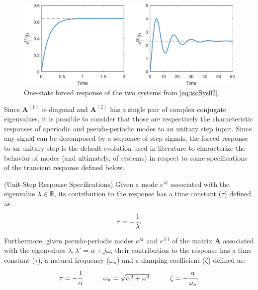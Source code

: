 \documentclass[a4paper,11pt]{book}
\numberwithin{figure}{chapter}
\numberwithin{equation}{chapter}
\numberwithin{table}{chapter}
\theoremstyle{definition}
\newtheorem{definition}{Definition}[chapter]
\newcounter{boxed-theorem}
\newcounter{boxed-definition}
\newenvironment{boxed-definition}[1]
{\begin{shaded} \begin{definition}{#1}}
{\end{definition} \end{shaded}}
\begin{document}
\begin{figure}[ht]
    \centering
    \includegraphics[width=\textwidth]{chapter2/forcedResponse}
    \caption{One-state forced response of the two systems from \eqref{eq:isoSys02}.}
    \label{fig:forcedResponse}
\end{figure}

Since $\bm{A}^{(1)}$ is diagonal and $\bm{A}^{(2)}$ has a single pair of complex conjugate eigenvalues, it is possible to consider that those are respectively the characteristic responses of aperiodic and pseudo-periodic modes to an unitary step input. Since any signal can be decomposed by a sequence of step signals, the forced response to an unitary step is the default evolution used in literature to characterize the behavior of modes (and ultimately, of systems) in respect to some specifications of the transient response defined below.

\begin{boxed-definition}{(Unit-Step Response Specifications)} \label{def:responseParameters}
    Given a mode $e^{\lambda t}$ associated with the eigenvalue $\lambda \in \mathbb{R}$, its contribution to the response has a time constant ($\tau$) defined as
    \begin{equation}
        \tau = - \cfrac{1}{\lambda}
    .\end{equation}  
    
    Furthermore, given pseudo-periodic modes $e^{\lambda t}$ and $e^{\lambda' t}$ of the matrix $\bm{A}$ associated with the eigenvalues $\lambda,\lambda' = \alpha \pm j \omega$, their contribution to the response has a time constant ($\tau$), a natural frequency ($\omega_n$) and a damping coefficient ($\zeta$) defined as:
    \begin{equation}
    \begin{matrix}
        \tau = - \cfrac{1}{\alpha} & & & \omega_n = \sqrt{\alpha^2 + \omega^2} & & & \zeta = - \cfrac{\alpha}{\omega_n}
    \end{matrix}
    .\end{equation}
    
\end{boxed-definition}   
\end{document}
